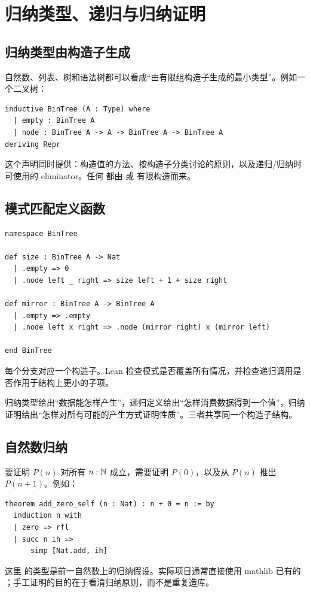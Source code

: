 \chapter{归纳类型、递归与归纳证明}

\section{归纳类型由构造子生成}

自然数、列表、树和语法树都可以看成“由有限组构造子生成的最小类型”。例如一个二叉树：
\begin{lstlisting}
inductive BinTree (A : Type) where
  | empty : BinTree A
  | node : BinTree A -> A -> BinTree A -> BinTree A
deriving Repr
\end{lstlisting}
这个声明同时提供：构造值的方法、按构造子分类讨论的原则，以及递归/归纳时可使用的 eliminator。任何  都由  或  有限构造而来。

\section{模式匹配定义函数}

\begin{lstlisting}
namespace BinTree

def size : BinTree A -> Nat
  | .empty => 0
  | .node left _ right => size left + 1 + size right

def mirror : BinTree A -> BinTree A
  | .empty => .empty
  | .node left x right => .node (mirror right) x (mirror left)

end BinTree
\end{lstlisting}
每个分支对应一个构造子。Lean 检查模式是否覆盖所有情况，并检查递归调用是否作用于结构上更小的子项。

\begin{intuitionbox}
归纳类型给出“数据能怎样产生”，递归定义给出“怎样消费数据得到一个值”，归纳证明给出“怎样对所有可能的产生方式证明性质”。三者共享同一个构造子结构。
\end{intuitionbox}

\section{自然数归纳}

要证明 $P(n)$ 对所有 $n:\mathbb{N}$ 成立，需要证明 $P(0)$，以及从 $P(n)$ 推出 $P(n+1)$。例如：
\begin{lstlisting}
theorem add_zero_self (n : Nat) : n + 0 = n := by
  induction n with
  | zero => rfl
  | succ n ih =>
      simp [Nat.add, ih]
\end{lstlisting}
这里  的类型是前一自然数上的归纳假设。实际项目通常直接使用 mathlib 已有的 ；手工证明的目的在于看清归纳原则，而不是重复造库。

